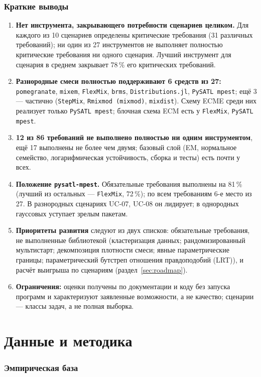 \documentclass[10pt,a4paper]{article}
\begin{document}
\section*{Краткие выводы}
\begin{enumerate}
\item \textbf{Нет инструмента, закрывающего потребности сценариев целиком.} Для каждого из 10 сценариев определены критические требования
(31 различных требований); ни один из 27 инструментов не выполняет полностью критические требования ни одного сценария.
Лучший инструмент для сценария в среднем закрывает 78\,\% его критических требований.
\item \textbf{Разнородные смеси полностью поддерживают 6 средств из 27:}
\texttt{pomegranate}, \texttt{mixem}, \texttt{FlexMix}, \texttt{brms}, \texttt{Distributions.jl}, \texttt{PySATL mpest}; ещё 3 --- частично (\texttt{StepMix}, \texttt{Rmixmod (mixmod)}, \texttt{mixdist}).
Схему ECME среди них реализует только \texttt{PySATL mpest}; блочная схема ECM есть у \texttt{FlexMix}, \texttt{PySATL mpest}.
\item \textbf{12 из 86 требований не выполнено полностью ни одним инструментом}, ещё 17 выполнены не более чем двумя;
базовый слой (EM, нормальное семейство, логарифмическая устойчивость, сборка и тесты) есть почти у всех.
\item \textbf{Положение \texttt{pysatl-mpest}.} Обязательные требования выполнены на 81\,\% (лучший из остальных --- \texttt{FlexMix}, 72\,\%);
по всем требованиям 6-е место из 27. В разнородных сценариях UC-07, UC-08 он лидирует; в однородных гауссовых уступает зрелым пакетам.
\item \textbf{Приоритеты развития} следуют из двух списков: обязательные требования, не выполненные библиотекой
(кластеризация данных; рандомизированный мультистарт; декомпозиция плотности смеси; явные параметрические границы; параметрический бутстреп отношения правдоподобий (LRT)), и расчёт выигрыша по сценариям (раздел~\ref{sec:roadmap}).
\item \textbf{Ограничения:} оценки получены по документации и коду без запуска программ и характеризуют заявленные возможности, а не качество; сценарии --- классы задач, а не полная выборка.
\end{enumerate}

\part{Данные и методика}
\section{Эмпирическая база}
\end{document}
